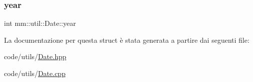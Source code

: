 \mbox{\label{structmm_1_1util_1_1_date_a318909ff98468f29c7912fa9cffea079}} 
\subsubsection{\texorpdfstring{year}{year}}
{\footnotesize\ttfamily int mm\+::util\+::\+Date\+::year}



La documentazione per questa struct è stata generata a partire dai seguenti file\+:\begin{DoxyCompactItemize}
\item 
code/utils/\mbox{\hyperlink{_date_8hpp}{Date.\+hpp}}\item 
code/utils/\mbox{\hyperlink{_date_8cpp}{Date.\+cpp}}\end{DoxyCompactItemize}

